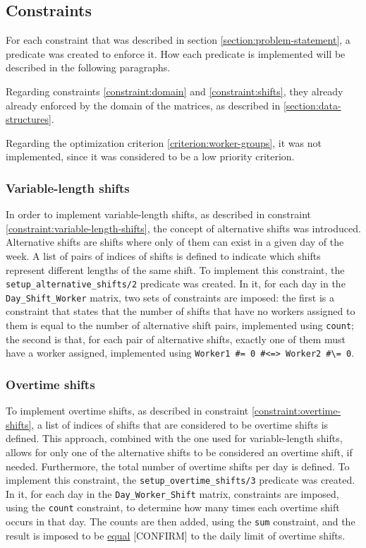 \documentclass[conference]{IEEEtran}
\def\CONFIRM#1{\underline{#1} {\color{red}[CONFIRM]\color{black}}}
\begin{document}
\subsection{Constraints}
\label{section:constraints}

For each constraint that was described in section \ref{section:problem-statement}, a predicate was created to enforce it. How each predicate is implemented will be described in the following paragraphs.

Regarding constraints \ref{constraint:domain} and \ref{constraint:shifts}, they already already enforced by the domain of the matrices, as described in \ref{section:data-structures}.

Regarding the optimization criterion \ref{criterion:worker-groups}, it was not implemented, since it was considered to be a low priority criterion.

\subsubsection*{Variable-length shifts}

In order to implement variable-length shifts, as described in constraint \ref{constraint:variable-length-shifts}, the concept of alternative shifts was introduced. Alternative shifts are shifts where only of them can exist in a given day of the week. A list of pairs of indices of shifts is defined to indicate which shifts represent different lengths of the same shift.
To implement this constraint, the \texttt{setup\_alternative\_shifts/2} predicate was created. In it, for each day in the \texttt{Day\_Shift\_Worker} matrix, two sets of constraints are imposed: the first is a constraint that states that the number of shifts that have no workers assigned to them is equal to the number of alternative shift pairs, implemented using \texttt{count}; the second is that, for each pair of alternative shifts, exactly one of them must have a worker assigned, implemented using \texttt{Worker1 \#= 0 \#<=> Worker2 \#\textbackslash= 0}.

\subsubsection*{Overtime shifts}

To implement overtime shifts, as described in constraint \ref{constraint:overtime-shifts}, a list of indices of shifts that are considered to be overtime shifts is defined. This approach, combined with the one used for variable-length shifts, allows for only one of the alternative shifts to be considered an overtime shift, if needed. Furthermore, the total number of overtime shifts per day is defined.
To implement this constraint, the \texttt{setup\_overtime\_shifts/3} predicate was created. In it, for each day in the \texttt{Day\_Worker\_Shift} matrix, constraints are imposed, using the \texttt{count} constraint, to determine how many times each overtime shift occurs in that day. The counts are then added, using the \texttt{sum} constraint, and the result is imposed to be \CONFIRM{equal} to the daily limit of overtime shifts.
\end{document}
